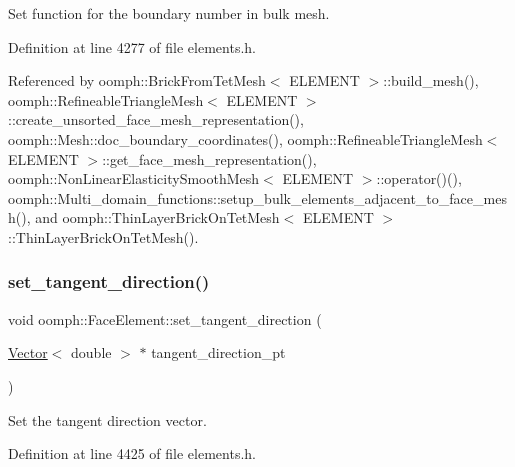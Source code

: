 Set function for the boundary number in bulk mesh. 



Definition at line 4277 of file elements.\+h.



Referenced by oomph\+::\+Brick\+From\+Tet\+Mesh$<$ E\+L\+E\+M\+E\+N\+T $>$\+::build\+\_\+mesh(), oomph\+::\+Refineable\+Triangle\+Mesh$<$ E\+L\+E\+M\+E\+N\+T $>$\+::create\+\_\+unsorted\+\_\+face\+\_\+mesh\+\_\+representation(), oomph\+::\+Mesh\+::doc\+\_\+boundary\+\_\+coordinates(), oomph\+::\+Refineable\+Triangle\+Mesh$<$ E\+L\+E\+M\+E\+N\+T $>$\+::get\+\_\+face\+\_\+mesh\+\_\+representation(), oomph\+::\+Non\+Linear\+Elasticity\+Smooth\+Mesh$<$ E\+L\+E\+M\+E\+N\+T $>$\+::operator()(), oomph\+::\+Multi\+\_\+domain\+\_\+functions\+::setup\+\_\+bulk\+\_\+elements\+\_\+adjacent\+\_\+to\+\_\+face\+\_\+mesh(), and oomph\+::\+Thin\+Layer\+Brick\+On\+Tet\+Mesh$<$ E\+L\+E\+M\+E\+N\+T $>$\+::\+Thin\+Layer\+Brick\+On\+Tet\+Mesh().

\mbox{\label{classoomph_1_1FaceElement_a9dc897bfa6a1738a7a81ab9cd160ffb0}} 
\subsubsection{\texorpdfstring{set\+\_\+tangent\+\_\+direction()}{set\_tangent\_direction()}}
{\footnotesize\ttfamily void oomph\+::\+Face\+Element\+::set\+\_\+tangent\+\_\+direction (\begin{DoxyParamCaption}\item[{\hyperlink{classoomph_1_1Vector}{Vector}$<$ double $>$ $\ast$}]{tangent\+\_\+direction\+\_\+pt }\end{DoxyParamCaption})\hspace{0.3cm}{\ttfamily [inline]}}



Set the tangent direction vector. 



Definition at line 4425 of file elements.\+h.

\mbox{\label{classoomph_1_1FaceElement_a361f92bae4d926903947e2e0d7672f3c}} 

